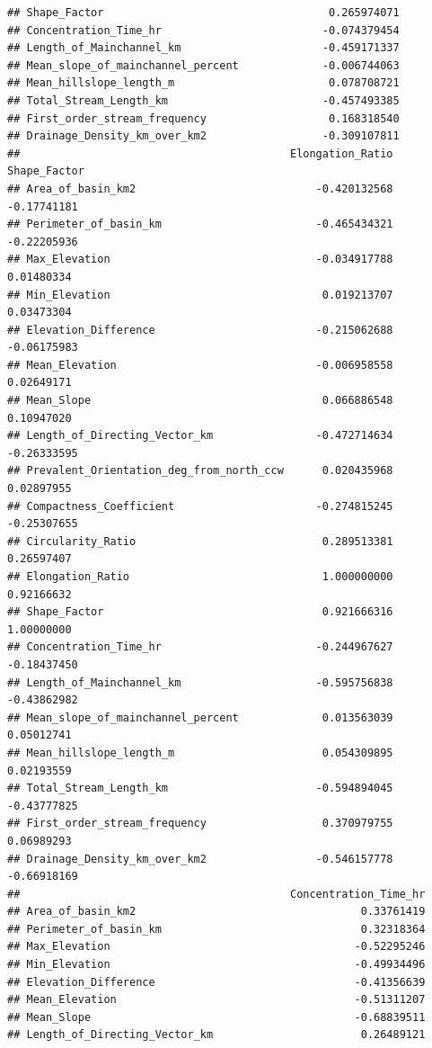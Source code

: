 \documentclass[11pt,]{article}
\begin{document}
\begin{verbatim}
## Shape_Factor                                   0.265974071
## Concentration_Time_hr                         -0.074379454
## Length_of_Mainchannel_km                      -0.459171337
## Mean_slope_of_mainchannel_percent             -0.006744063
## Mean_hillslope_length_m                        0.078708721
## Total_Stream_Length_km                        -0.457493385
## First_order_stream_frequency                   0.168318540
## Drainage_Density_km_over_km2                  -0.309107811
##                                          Elongation_Ratio Shape_Factor
## Area_of_basin_km2                            -0.420132568  -0.17741181
## Perimeter_of_basin_km                        -0.465434321  -0.22205936
## Max_Elevation                                -0.034917788   0.01480334
## Min_Elevation                                 0.019213707   0.03473304
## Elevation_Difference                         -0.215062688  -0.06175983
## Mean_Elevation                               -0.006958558   0.02649171
## Mean_Slope                                    0.066886548   0.10947020
## Length_of_Directing_Vector_km                -0.472714634  -0.26333595
## Prevalent_Orientation_deg_from_north_ccw      0.020435968   0.02897955
## Compactness_Coefficient                      -0.274815245  -0.25307655
## Circularity_Ratio                             0.289513381   0.26597407
## Elongation_Ratio                              1.000000000   0.92166632
## Shape_Factor                                  0.921666316   1.00000000
## Concentration_Time_hr                        -0.244967627  -0.18437450
## Length_of_Mainchannel_km                     -0.595756838  -0.43862982
## Mean_slope_of_mainchannel_percent             0.013563039   0.05012741
## Mean_hillslope_length_m                       0.054309895   0.02193559
## Total_Stream_Length_km                       -0.594894045  -0.43777825
## First_order_stream_frequency                  0.370979755   0.06989293
## Drainage_Density_km_over_km2                 -0.546157778  -0.66918169
##                                          Concentration_Time_hr
## Area_of_basin_km2                                   0.33761419
## Perimeter_of_basin_km                               0.32318364
## Max_Elevation                                      -0.52295246
## Min_Elevation                                      -0.49934496
## Elevation_Difference                               -0.41356639
## Mean_Elevation                                     -0.51311207
## Mean_Slope                                         -0.68839511
## Length_of_Directing_Vector_km                       0.26489121

\end{verbatim}
\end{document}
